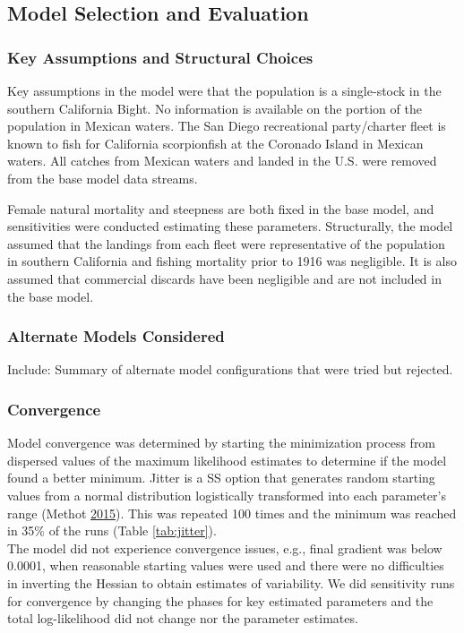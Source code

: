 \documentclass[12pt,]{article}
\begin{document}
\subsection{Model Selection and
Evaluation}\label{model-selection-and-evaluation}

\subsubsection{Key Assumptions and Structural
Choices}\label{key-assumptions-and-structural-choices}

Key assumptions in the model were that the population is a single-stock
in the southern California Bight. No information is available on the
portion of the population in Mexican waters. The San Diego recreational
party/charter fleet is known to fish for California scorpionfish at the
Coronado Island in Mexican waters. All catches from Mexican waters and
landed in the U.S. were removed from the base model data streams.

Female natural mortality and steepness are both fixed in the base model,
and sensitivities were conducted estimating these parameters.
Structurally, the model assumed that the landings from each fleet were
representative of the population in southern California and fishing
mortality prior to 1916 was negligible. It is also assumed that
commercial discards have been negligible and are not included in the
base model.

\subsubsection{Alternate Models
Considered}\label{alternate-models-considered}

Include: Summary of alternate model configurations that were tried but
rejected.

\subsubsection{Convergence}\label{convergence}

Model convergence was determined by starting the minimization process
from dispersed values of the maximum likelihood estimates to determine
if the model found a better minimum. Jitter is a SS option that
generates random starting values from a normal distribution logistically
transformed into each parameter's range (Methot
\protect\hyperlink{ref-Methot2015}{2015}). This was repeated 100 times
and the minimum was reached in 35\% of the runs (Table
\ref{tab:jitter}).\\
The model did not experience convergence issues, e.g., final gradient
was below 0.0001, when reasonable starting values were used and there
were no difficulties in inverting the Hessian to obtain estimates of
variability. We did sensitivity runs for convergence by changing the
phases for key estimated parameters and the total log-likelihood did not
change nor the parameter estimates.
\end{document}
